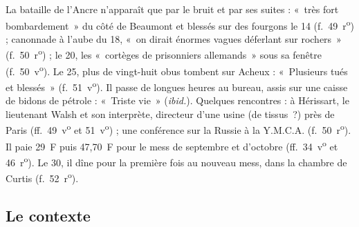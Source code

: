 La bataille de l'Ancre n'apparaît que par le bruit et par ses suites : «~très fort bombardement~» du côté de Beaumont et blessés sur des fourgons le 14 (f.~49~r\textsuperscript{o}) ; canonnade à l'aube du 18, «~on dirait énormes vagues déferlant sur rochers~» (f.~50~r\textsuperscript{o}) ; le 20, les «~cortèges de prisonniers allemands~» sous sa fenêtre (f.~50~v\textsuperscript{o}). Le 25, plus de vingt-huit obus tombent sur Acheux : «~Plusieurs tués et blessés~» (f.~51~v\textsuperscript{o}). Il passe de longues heures au bureau, assis sur une caisse de bidons de pétrole : «~Triste vie~» (\textit{ibid.}). Quelques rencontres : à Hérissart, le lieutenant Walsh et son interprète, directeur d'une usine (de tissus~?) près de Paris (ff.~49~v\textsuperscript{o} et 51~v\textsuperscript{o}) ; une conférence sur la Russie à la Y.M.C.A. (f.~50~r\textsuperscript{o}). Il paie 29~F puis 47,70~F pour le mess de septembre et d'octobre (ff.~34~v\textsuperscript{o} et 46~r\textsuperscript{o}). Le 30, il dîne pour la première fois au nouveau mess, dans la chambre de Curtis (f.~52~r\textsuperscript{o}).

\subsection*{Le contexte}

